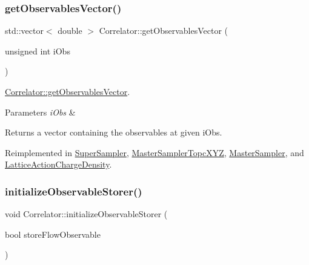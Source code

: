 \mbox{\label{class_correlator_a7fb062b098beb078f3e546f4717b4941}} 
\subsubsection{\texorpdfstring{getObservablesVector()}{getObservablesVector()}}
{\footnotesize\ttfamily std\+::vector$<$ double $>$ Correlator\+::get\+Observables\+Vector (\begin{DoxyParamCaption}\item[{unsigned int}]{i\+Obs }\end{DoxyParamCaption})\hspace{0.3cm}{\ttfamily [virtual]}}



\mbox{\hyperlink{class_correlator_a7fb062b098beb078f3e546f4717b4941}{Correlator\+::get\+Observables\+Vector}}. 


\begin{DoxyParams}{Parameters}
{\em i\+Obs} & \\
\hline
\end{DoxyParams}
\begin{DoxyReturn}{Returns}
a vector containing the observables at given i\+Obs. 
\end{DoxyReturn}


Reimplemented in \mbox{\hyperlink{class_super_sampler_a2b81588289576169c2148a88ddad482f}{Super\+Sampler}}, \mbox{\hyperlink{class_master_sampler_topc_x_y_z_a1a922db23320ff46f8f736788c6977bb}{Master\+Sampler\+Topc\+X\+YZ}}, \mbox{\hyperlink{class_master_sampler_a471dffa3f29c68b4152b195708a9a5ac}{Master\+Sampler}}, and \mbox{\hyperlink{class_lattice_action_charge_density_a72952fbe5ade96d53196d6c2c93896e5}{Lattice\+Action\+Charge\+Density}}.

\mbox{\label{class_correlator_ab99886c09dd27dfc8676d0032cecf9bc}} 
\subsubsection{\texorpdfstring{initializeObservableStorer()}{initializeObservableStorer()}}
{\footnotesize\ttfamily void Correlator\+::initialize\+Observable\+Storer (\begin{DoxyParamCaption}\item[{bool}]{store\+Flow\+Observable }\end{DoxyParamCaption})\hspace{0.3cm}{\ttfamily [virtual]}}



